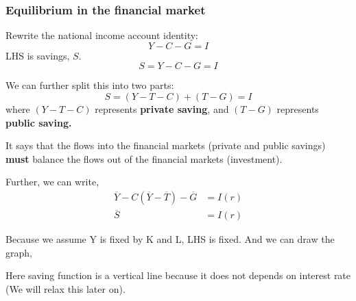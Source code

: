 \documentclass[12pt]{article}
\begin{document}
\subsubsection{Equilibrium in the financial market}
Rewrite the national income account identity:
\begin{equation*}
Y - C - G = I
\end{equation*}
LHS is savings, $ S $.
\begin{equation*}
S = Y - C - G = I
\end{equation*}

We can further split this into two parts:
\begin{equation*}
S = (Y - T - C) + (T - G) = I
\end{equation*}
where $ (Y - T - C) $ represents {\textbf {private saving}}, and $ (T - G) $ represents
{\textbf {public saving.}}

It says that the flows into the financial markets (private and public savings) 
{\textbf {must}} balance the flows out of the financial markets (investment).

Further, we can write,
\begin{align*}
\overline{Y} - C( \overline{Y} -  \overline{T}) -  \overline{G} &= I(r)\\
 \overline{S} &= I(r)
\end{align*}

Because we assume Y is fixed by K and L, LHS is fixed. And we can draw the graph,

\begin{figure}[H]
\end{figure}

Here saving function is a vertical line because it does not depends on interest rate 
(We will relax this later on).
\end{document}

